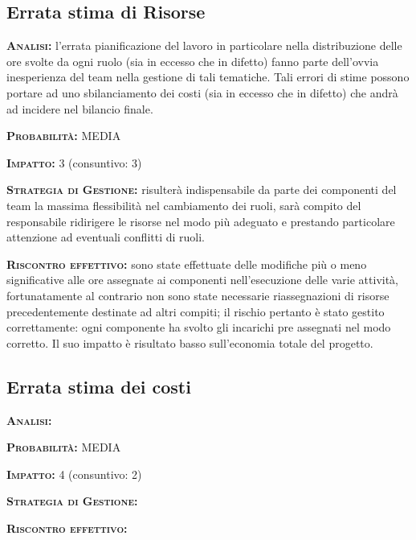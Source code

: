 \subsection{Errata stima di Risorse}
\begin{description}
	\item{\scshape\bfseries Analisi:} l'errata pianificazione del lavoro in particolare nella distribuzione delle ore svolte da ogni ruolo (sia in eccesso che in difetto) fanno parte dell'ovvia inesperienza del team nella gestione di tali tematiche. Tali errori di stime possono portare ad uno sbilanciamento dei costi (sia in eccesso che in difetto) che andrà ad incidere nel bilancio finale.
	\item{\scshape\bfseries Probabilità:} MEDIA
	\item{\scshape\bfseries Impatto:} 3 (consuntivo: 3)
	\item{\scshape\bfseries Strategia di Gestione:} risulterà indispensabile da parte dei componenti del team la massima flessibilità nel cambiamento dei ruoli, sarà compito del responsabile ridirigere le risorse nel modo più adeguato e prestando particolare attenzione ad eventuali conflitti di ruoli.
	\item{\scshape\bfseries Riscontro effettivo:} sono state effettuate delle modifiche più o meno significative alle ore assegnate ai componenti nell'esecuzione delle varie attività, fortunatamente al contrario non sono state necessarie riassegnazioni di risorse precedentemente destinate ad altri compiti; il rischio pertanto è stato gestito correttamente: ogni componente ha svolto gli incarichi pre assegnati nel modo corretto. Il suo impatto è risultato basso sull'economia totale del progetto.
\end{description}

\subsection{Errata stima dei costi}
\begin{description}
	\item{\scshape\bfseries Analisi:} 
	\item{\scshape\bfseries Probabilità:} MEDIA
	\item{\scshape\bfseries Impatto:} 4 (consuntivo: 2)
	\item{\scshape\bfseries Strategia di Gestione:} 
	\item{\scshape\bfseries Riscontro effettivo:} 
\end{description}

